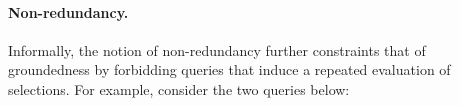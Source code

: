 \iffalse
We formalize the latter with the following definition in Coq.
\begin{verbatim}
Definition is_a_grounded_typed_nf_query 
  (s : wfGraphQLSchema) (|$\query$| : query) :=
    are_in_ground_typed_nf s |$\query$|.(selection_set).
  \end{verbatim}
  \fi 

\iffalse
\begin{verbatim}
Lemma are_grounded_in_ground_typed_nf (s : wfGraphQLSchema)
                                      (type_in_scope : Name)
                                      (queries : seq Query) :
        are_grounded s type_in_scope queries ->
        are_in_ground_typed_nf s queries.
\end{verbatim}
\fi





\paragraph{Non-redundancy.} Informally, the notion of non-redundancy
further constraints that of groundedness by forbidding queries that induce a repeated evaluation of selections. For example, consider the two queries below:


